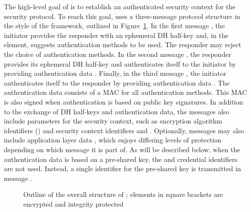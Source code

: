 \fillhack
The high-level goal of \mEdhoc{} is to establish an authenticated security
context for the \mOscore{} security protocol.
%
To reach this goal, \mEdhoc{} uses a three-message protocol structure
in the style of the \mNoise{} framework, outlined in
Figure~\ref{fig:edhocFramework}.
%
In the first message \mMsgone{}, the initiator provides the responder with an
ephemeral DH half-key \mGx{} and, in the \mMethod{} element, suggests
authentication methods to be used.
%
The responder may reject the choice of authentication methods.
%
In the second message \mMsgtwo{}, the responder provides its ephemeral
DH half-key \mGy{} and authenticates itself to the initiator by
providing authentication data \mAuthr{}.
%
Finally, in the third message \mMsgthree{}, the initiator authenticates itself
to the responder by providing authentication data \mAuthi{}.
%
The authentication data consists of a MAC for all authentication methods.
%
This MAC is also signed when authentication is based on public key signatures.
%
In addition to the exchange of DH half-keys and authentication data, the
messages also include parameters for the \mOscore{} security context, such as
encryption algorithm identifiers (\mSuites{}) and \mOscore{} security context
identifiers \mCi{} and \mCr{}.
%
Optionally, messages may also include application layer data \mAD{}, which
enjoys differing levels of protection depending on which message it is part of.
%
As will be described below, when the authentication data is based on
a pre-shared key, the \mCredi{} and \mCredr{} credential identifiers are not
used.
%
Instead, a single identifier for the pre-shared key is transmitted in
message \mMsgone{}.
%
\begin{figure}
\centering
{}
\caption{Outline of the overall structure of \mEdhoc{}; elements in square
brackets are encrypted and integrity protected}
\label{fig:edhocFramework}
\end{figure}

